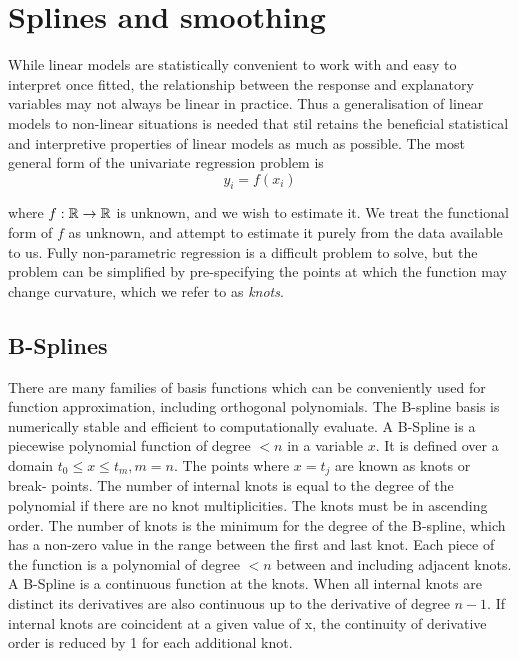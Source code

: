 \section{Splines and smoothing}
While linear models are statistically convenient to work with and easy to interpret once fitted, the
relationship between the response and explanatory variables may not always be linear in practice. Thus a
generalisation of linear models to non-linear situations is needed that stil retains the beneficial
statistical and interpretive properties of linear models as much as possible. The most general form of the
univariate regression problem is
$$
	y_i = f(x_i)
$$

\noindent where $f: {\mathbb{R}} \to {\mathbb{R}}$ is unknown, and we wish to estimate it. We treat the functional form of $f$ as
unknown, and attempt to estimate it purely from the data available to us. Fully non-parametric regression is a
difficult problem to solve, but the problem can be simplified by pre-specifying the points at which the
function may change curvature, which we refer to as \emph{knots}.

\subsection{B-Splines}

There are many families of basis functions which can be conveniently used for function approximation,
including orthogonal polynomials. The B-spline basis \citep{DeBoor1972} is numerically stable and efficient to
computationally evaluate. A B-Spline is a piecewise polynomial function of degree $< n$ in a variable $x$. It
is defined over a domain $t_0 \leq x \leq t_m, m=n$. The points where $x = t_j$ are known as knots or break-
points. The number of internal knots is equal to the degree of the polynomial if there are no knot
multiplicities. The knots must be in ascending order. The number of knots is the minimum for the degree of the
B-spline, which has a non-zero value in the range between the first and last knot. Each piece of the function
is a polynomial of degree $< n$ between and including adjacent knots. A B-Spline is a continuous function at
the knots. When all internal knots are distinct its derivatives are also continuous up to the derivative of
degree $n - 1$. If internal knots are coincident at a given value of x, the continuity of derivative order is
reduced by 1 for each additional knot.

